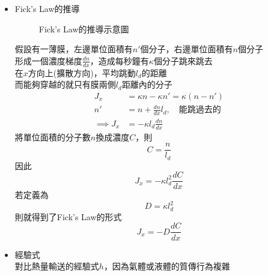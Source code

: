 \documentclass[../main.tex]{subfiles}
\begin{document}
\begin{itemize}
\begin{itemize}
  \begin{equation}
    \nabla^2 C_A = 0
  \end{equation}
  此為Laplace Equation
\end{itemize}
\item Fick's Law的推導
\begin{figure}[H]
  \centering
  \caption{Fick's Law的推導示意圖}
\end{figure}
假設有一薄膜，左邊單位面積有$n'$個分子，右邊單位面積有$n$個分子\\
形成一個濃度梯度$\frac{dn}{dx}$，造成每秒鐘有$\kappa$個分子跳來跳去\\
在$x$方向上(擴散方向)，平均跳動$l_d$的距離\\
而能夠穿越的就只有膜兩側$l_d$距離內的分子
\begin{align}
  J_x &= \kappa n - \kappa n' = \kappa (n- n')  \\
  n' &= n + \frac{dn}{dx} l_d ,\quad \text{能跳過去的}\\
  \implies J_x &= -\kappa l_d \frac{dn}{dx} 
\end{align}
將單位面積的分子數$n$換成濃度$C$，則
\begin{equation}
  C = \frac{n}{l_d}
\end{equation}
因此
\begin{equation}
  J_x = -\kappa l_d^2 \frac{dC}{dx} \label{eq:ficks_law_derivation}
\end{equation}
若定義為
\begin{equation}
  D = \kappa l_d^2
\end{equation}
則就得到了Fick's Law的形式
\begin{equation}
  \boxed{J_x = -D \frac{dC}{dx}}
\end{equation}
\item 經驗式\\
  對比熱量輸送的經驗式$h$，因為氣體或液體的質傳行為複雜\\

\end{itemize}
\end{document}

